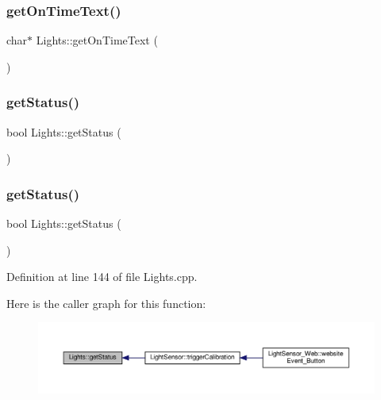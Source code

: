 \subsubsection{\texorpdfstring{get\+On\+Time\+Text()}{getOnTimeText()}\hspace{0.1cm}{\footnotesize\ttfamily [2/2]}}
{\footnotesize\ttfamily char$\ast$ Lights\+::get\+On\+Time\+Text (\begin{DoxyParamCaption}{ }\end{DoxyParamCaption})}

\mbox{\label{class_lights_a240cc60cfb0f2b94b1cd9e8a9202b7ee}} 
\subsubsection{\texorpdfstring{get\+Status()}{getStatus()}\hspace{0.1cm}{\footnotesize\ttfamily [1/2]}}
{\footnotesize\ttfamily bool Lights\+::get\+Status (\begin{DoxyParamCaption}{ }\end{DoxyParamCaption})}

\mbox{\label{class_lights_a240cc60cfb0f2b94b1cd9e8a9202b7ee}} 
\subsubsection{\texorpdfstring{get\+Status()}{getStatus()}\hspace{0.1cm}{\footnotesize\ttfamily [2/2]}}
{\footnotesize\ttfamily bool Lights\+::get\+Status (\begin{DoxyParamCaption}{ }\end{DoxyParamCaption})}



Definition at line 144 of file Lights.\+cpp.

Here is the caller graph for this function\+:
\nopagebreak
\begin{figure}[H]
\begin{center}
\leavevmode
\includegraphics[width=350pt]{class_lights_a240cc60cfb0f2b94b1cd9e8a9202b7ee_icgraph}
\end{center}
\end{figure}
\mbox{\label{class_lights_a713a28eba8f6fd8fb259bac4175ece26}} 
